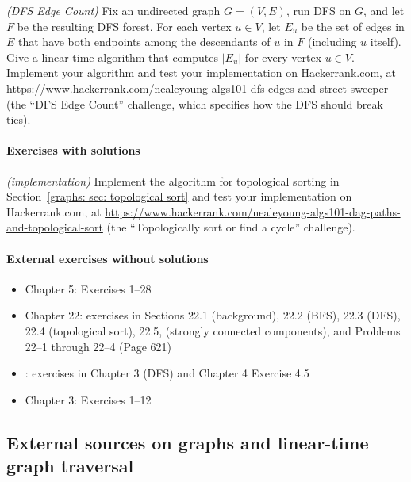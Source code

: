 \documentclass[11pt]{article}
\begin{document}
\exercise\emph{(DFS Edge Count)}
Fix an undirected graph $G=(V,E)$, run DFS on $G$, and let $F$ be the resulting DFS forest.
For each vertex $u\in V$, let $E_u$ be the set of edges in $E$
that have both endpoints among the descendants of $u$ in $F$ (including $u$ itself).
Give a linear-time algorithm that computes $|E_u|$ for every vertex $u\in V$.
Implement your algorithm and test your implementation on Hackerrank.com, at
\url{https://www.hackerrank.com/nealeyoung-algs101-dfs-edges-and-street-sweeper}
(the ``DFS Edge Count'' challenge, which specifies how the DFS should break ties).

\paragraph{Exercises with solutions}

\exercise\emph{(implementation)}
Implement the algorithm for topological sorting in Section~\ref{graphs: sec: topological sort}
and test your implementation on Hackerrank.com, at
\url{https://www.hackerrank.com/nealeyoung-algs101-dag-paths-and-topological-sort}
(the ``Topologically sort or find a cycle'' challenge).

\solution
{}

\paragraph{External exercises without solutions}

\begin{itemize}
\item \JE Chapter 5: Exercises 1--28
\item \CLRS Chapter 22: exercises in Sections 22.1 (background), 22.2 (BFS), 22.3 (DFS), 22.4 (topological sort), 22.5, (strongly connected components), and Problems 22--1 through 22--4 (Page 621)
\item \DPV: exercises in Chapter 3 (DFS) and Chapter 4 Exercise 4.5
\item \KT Chapter 3: Exercises 1--12
\end{itemize}

\subsection{External sources on graphs and linear-time graph traversal}
\end{document}
